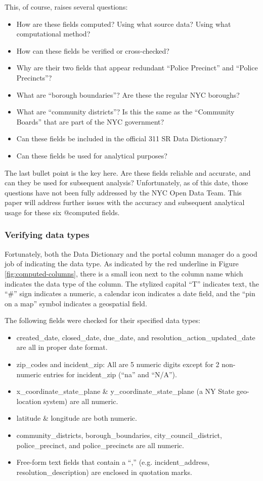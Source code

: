 \documentclass[12pt, titlepage]{article}
\begin{document}
	This, of course, raises several questions:
	\begin{itemize}
		\item How are these fields computed? Using what source data? Using what computational method?
		\item How can these fields be verified or cross-checked?
		\item Why are their two fields that appear redundant ``Police Precinct'' and ``Police Precincts''?
		\item What are ``borough boundaries''? Are these the regular NYC boroughs?
		\item What are ``community districts''? Is this the same as the ``Community Boards'' that are part of the NYC government?
		\item Can these fields be included in the official 311 SR Data Dictionary?
		\item Can these fields be used for analytical purposes? 
	\end{itemize}	

	The last bullet point is the key here. Are these fields reliable and accurate, and can they be used for subsequent analysis? Unfortunately,
	as of this date, those questions have not been fully addressed by the  NYC Open Data Team. This paper will address further issues with the
	accuracy and subsequent analytical usage for these six @computed fields.
	
	\subsubsection{Verifying data types}
	Fortunately, both the Data Dictionary and the portal column manager do a good job of indicating the data type.
	As indicated by the red underline in Figure \ref{fig:computed-columns}, there is a small icon next to the column name 
	which indicates the data type of the column. The stylized capital ``T'' indicates text, the ``\#'' sign indicates 
	a numeric, a calendar icon indicates a date field, and the ``pin on a map'' symbol indicates a geospatial field. 
	
	The following fields were checked for their specified data types:
	
		\begin{itemize}
		\item created\_date, closed\_date, due\_date, and resolution\_action\_updated\_date are all in proper date format.
		\item zip\_codes and incident\_zip: All are 5 numeric digits except for 2 non-numeric entries for incident\_zip (``na'' and ``N/A'').
		\item x\_coordinate\_state\_plane \&  y\_coordinate\_state\_plane (a NY State geo-location system) are all numeric.
		\item latitude \& longitude are both numeric.
		\item community\_districts, borough\_boundaries, city\_council\_district, police\_precinct, and police\_precincts are all numeric.
		\item Free-form text fields that contain a ``,'' (e.g. incident\_address, resolution\_description) are enclosed in quotation marks.
		\end{itemize}	
	
\end{document}
